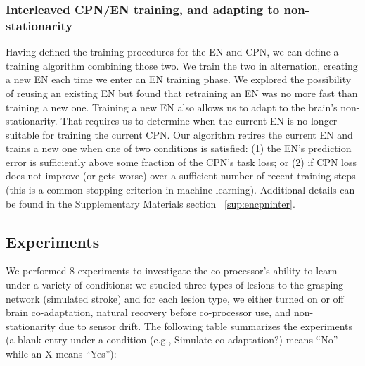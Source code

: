 \documentclass[12pt]{iopart}
\begin{document}
\subsubsection{Interleaved CPN/EN training, and adapting to non-stationarity}
\label{sec:interleaving}
Having defined the training procedures for the EN and CPN, we can define a training
algorithm combining those two. We train the two in alternation, creating
a new EN each time we enter an EN training phase. We explored the possibility
of reusing an existing EN but found that retraining an EN was no more fast than training a new one.
Training a new EN also allows us to adapt to the brain's non-stationarity. That requires us to
determine when the current EN is no longer suitable for training the current CPN. 
Our algorithm retires the current EN and trains a new one when one of two conditions
is satisfied: (1) the EN's prediction error is sufficiently above some fraction of the CPN's task loss;
or (2) if CPN loss does not improve (or gets worse) over a sufficient number of recent training steps 
(this is a common stopping criterion in machine learning). Additional details can be found in the
Supplementary Materials section ~\ref{sup:encpninter}.

\subsection{Experiments}
\label{sec:experiments}

We performed 8 experiments to investigate the co-processor's ability to learn under a variety of
conditions: we studied three types of lesions to the grasping network (simulated stroke) and for
each lesion type, we either turned on or off brain co-adaptation, natural recovery before co-processor
use, and non-stationarity due to sensor drift. The following table summarizes the experiments
(a blank entry under a condition (e.g., Simulate co-adaptation?) means ``No'' while an X means ``Yes''): \\
\end{document}

